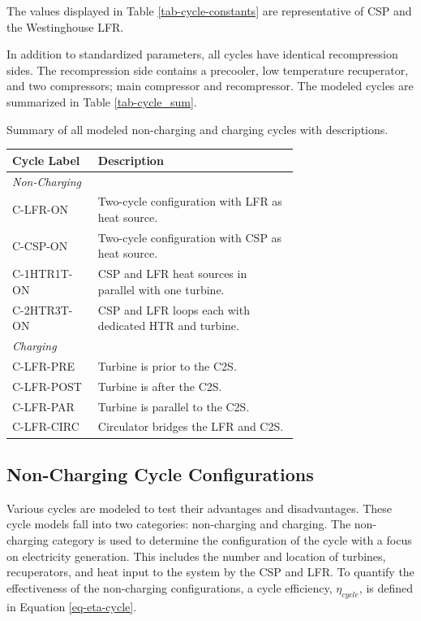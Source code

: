\begin{paracol}{2}
The values displayed in Table \ref{tab-cycle-constants} are representative of CSP and the Westinghouse LFR.


In addition to standardized parameters, all cycles have identical recompression sides. The recompression side contains a precooler, low temperature recuperator, and two compressors; main compressor and recompressor. 
The modeled cycles are summarized in Table \ref{tab-cycle_sum}.

\begin{specialtable}[H] 
    \caption{Summary of all modeled non-charging and charging cycles with descriptions. \label{tab-cycle_sum}}
    \begin{tabular}{lL{0.7\linewidth}}
    \toprule
    \textbf{Cycle Label} & \textbf{Description}\\
    \midrule
    \textit{Non-Charging}\\
    C-LFR-ON & Two-cycle configuration with LFR as heat source.\\
    C-CSP-ON & Two-cycle configuration with CSP as heat source.\\
    C-1HTR1T-ON & CSP and LFR heat sources in parallel with one turbine.\\
    C-2HTR3T-ON & CSP and LFR loops each with dedicated HTR and turbine.\\
    \midrule
    \textit{Charging}\\
    C-LFR-PRE & Turbine is prior to the C2S.\\
    C-LFR-POST & Turbine is after the C2S.\\
    C-LFR-PAR & Turbine is parallel to the C2S.\\
    C-LFR-CIRC & Circulator bridges the LFR and C2S.\\
    \bottomrule
    \end{tabular}
\end{specialtable}

\subsection{Non-Charging Cycle Configurations} 

Various cycles are modeled to test their advantages and disadvantages. These cycle models fall into two categories: non-charging and charging. The non-charging category is used to determine the configuration of the cycle with a focus on electricity generation. This includes the number and location of turbines, recuperators, and heat input to the system by the CSP and LFR. To quantify the effectiveness of the non-charging configurations, a cycle efficiency, $\eta_{cycle}$, is defined in Equation \ref{eq-eta-cycle}.


\end{paracol}
